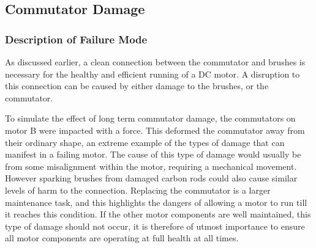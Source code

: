 
\subsection{Commutator Damage}

\subsubsection{Description of Failure Mode}

As discussed earlier, a clean connection between the commutator and brushes is necessary for the healthy and efficient running of a DC motor. A disruption to this connection can be caused by either damage to the brushes, or the commutator. 


To simulate the effect of long term commutator damage, the commutators on motor B were impacted with a force. This deformed the commutator away from their ordinary shape, an extreme example of the types of damage that can manifest in a failing motor. The cause of this type of damage would usually be from some misalignment within the motor, requiring a mechanical movement. However sparking brushes from damaged carbon rods could also cause similar levels of harm to the connection. Replacing the commutator is a larger maintenance task, and this highlights the dangers of allowing a motor to run till it reaches this condition. If the other motor components are well maintained, this type of damage should not occur, it is therefore of utmost importance to ensure all motor components are operating at full health at all times.  

